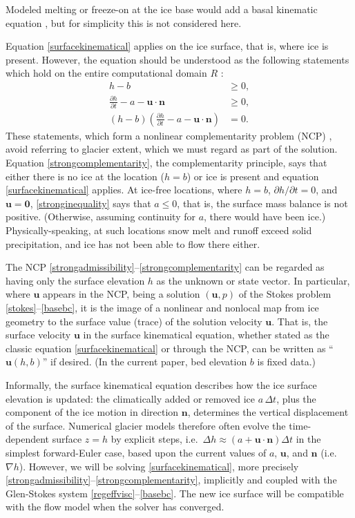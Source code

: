 \documentclass[letterpaper,final,12pt,reqno]{amsart}
\newcommand{\grad}{\nabla}
\newcommand{\bn}{\mathbf{n}}
\newcommand{\bu}{\mathbf{u}}
\newcommand{\bzero}{\bm{0}}
\begin{document}
Modeled melting or freeze-on at the ice base would add a basal kinematic equation \cite[for example]{Aschwandenetal2012}, but for simplicity this is not considered here.

Equation \eqref{surfacekinematical} applies on the ice surface, that is, where ice is present.  However, the equation should be understood as the following statements which hold on the entire computational domain $R$ \cite{SchoofHewitt2013}:
\begin{align}
h-b &\ge 0, \label{strongadmissibility} \\
\frac{\partial h}{\partial t} - a - \bu \cdot \bn &\ge 0, \label{stronginequality} \\
(h-b) \left(\frac{\partial h}{\partial t} - a - \bu \cdot \bn\right) &= 0. \label{strongcomplementarity}
\end{align}
These statements, which form a nonlinear complementarity problem (NCP) \cite{Bueler2016,Bueler2020}, avoid referring to glacier extent, which we must regard as part of the solution.  Equation \eqref{strongcomplementarity}, the complementarity principle, says that either there is no ice at the location ($h=b$) or ice is present and equation \eqref{surfacekinematical} applies.  At ice-free locations, where $h=b$, $\partial h/\partial t=0$, and $\bu=\bzero$, \eqref{stronginequality} says that $a \le 0$, that is, the surface mass balance is not positive.  (Otherwise, assuming continuity for $a$, there would have been ice.)  Physically-speaking, at such locations snow melt and runoff exceed solid precipitation, and ice has not been able to flow there either.

The NCP \eqref{strongadmissibility}--\eqref{strongcomplementarity} can be regarded as having only the surface elevation $h$ as the unknown or state vector.  In particular, where $\bu$ appears in the NCP, being a solution $(\bu,p)$ of the Stokes problem \eqref{stokes}--\eqref{basebc}, it is the image of a nonlinear and nonlocal map from ice geometry to the surface value (trace) of the solution velocity $\bu$.  That is, the surface velocity $\bu$ in the surface kinematical equation, whether stated as the classic equation \eqref{surfacekinematical} or through the NCP, can be written as ``$\bu(h,b)$'' if desired.  (In the current paper, bed elevation $b$ is fixed data.)

Informally, the surface kinematical equation describes how the ice surface elevation is updated: the climatically added or removed ice $a\,\Delta t$, plus the component of the ice motion in direction $\bn$, determines the vertical displacement of the surface.  Numerical glacier models therefore often evolve the time-dependent surface $z=h$ by explicit steps, i.e.~$\Delta h \approx \left(a + \bu\cdot \bn\right) \Delta t$ in the simplest forward-Euler case, based upon the current values of $a$, $\bu$, and $\bn$ (i.e.~$\grad h$).  However, we will be solving \eqref{surfacekinematical}, more precisely \eqref{strongadmissibility}--\eqref{strongcomplementarity}, implicitly and coupled with the Glen-Stokes system \eqref{regeffvisc}--\eqref{basebc}.  The new ice surface will be compatible with the flow model when the solver has converged.
\end{document}
